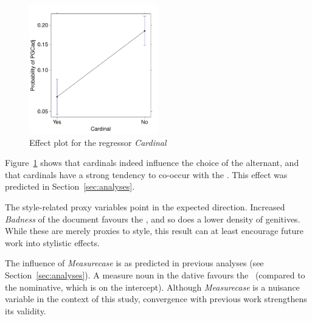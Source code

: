 \begin{figure}[h!]
  \centering
  \includegraphics[width=0.5\textwidth]{../R/output/corpus_Cardinal}
  \caption{Effect plot for the regressor \textit{Cardinal}}
  \label{fig:eff:leftcontext}
\end{figure}

Figure~\ref{fig:eff:leftcontext} shows that cardinals indeed influence the choice of the alternant, and that cardinals have a strong tendency to co-occur with the \NACa.
This effect was predicted in Section~\ref{sec:analyses}.

The style-related proxy variables point in the expected direction.
Increased \textit{Badness} of the document favours the \NACa, and so does a lower density of genitives.
While these are merely proxies to style, this result can at least encourage future work into stylistic effects. 

The influence of \textit{Measurecase} is as predicted in previous analyses (see Section~\ref{sec:analyses}).
A measure noun in the dative favours the \PGCa\ (compared to the nominative, which is on the intercept).
Although \textit{Measurecase} is a nuisance variable in the context of this study, convergence with previous work strengthens its validity.

